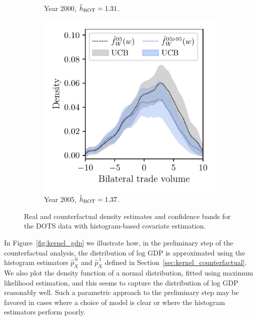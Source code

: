 \begin{figure}[t]
\begin{subfigure}{0.32\textwidth}
    \caption{Year 2000, $\hat h_{\operatorname{ROT}} = 1.31$.}
  \end{subfigure}
  \begin{subfigure}{0.32\textwidth}
    \centering
    \includegraphics[scale=0.64]{graphics/trade_plot_1995_2005.pdf}
    \caption{Year 2005, $\hat h_{\operatorname{ROT}} = 1.37$.}
  \end{subfigure}
  \caption[Histogram-based estimation and inference for the DOTS data]{
    Real and counterfactual density estimates and confidence bands for
  the DOTS data with histogram-based covariate estimation.}
  \label{fig:kernel_trade}
\end{figure}

In Figure~\ref{fig:kernel_gdp} we illustrate how, in the preliminary step of the
counterfactual analysis, the distribution of log GDP is approximated using the
histogram estimators $\hat p_X^{\,0}$ and $\hat p_X^{\,1}$ defined in
Section~\ref{sec:kernel_counterfactual}. We also plot the density function of a
normal distribution, fitted using maximum likelihood estimation, and this seems
to capture the distribution of log GDP reasonably well. Such a parametric
approach to the preliminary step may be favored in cases where a choice of
model is clear or where the histogram estimators perform poorly.

